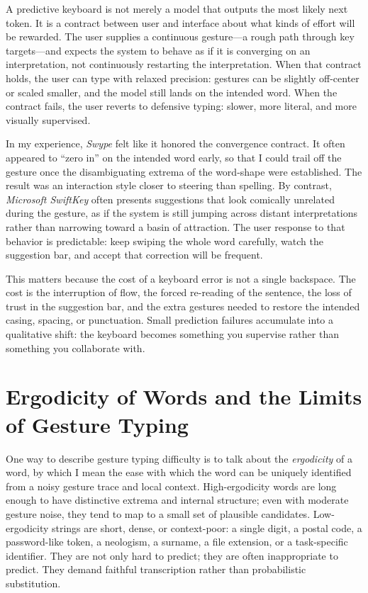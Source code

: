 \documentclass[11pt]{article}
\begin{document}
A predictive keyboard is not merely a model that outputs the most likely next token. It is a contract between user and interface about what kinds of effort will be rewarded. The user supplies a continuous gesture---a rough path through key targets---and expects the system to behave as if it is converging on an interpretation, not continuously restarting the interpretation. When that contract holds, the user can type with relaxed precision: gestures can be slightly off-center or scaled smaller, and the model still lands on the intended word. When the contract fails, the user reverts to defensive typing: slower, more literal, and more visually supervised.

In my experience, \textit{Swype} felt like it honored the convergence contract. It often appeared to ``zero in'' on the intended word early, so that I could trail off the gesture once the disambiguating extrema of the word-shape were established. The result was an interaction style closer to steering than spelling. By contrast, \textit{Microsoft SwiftKey} often presents suggestions that look comically unrelated during the gesture, as if the system is still jumping across distant interpretations rather than narrowing toward a basin of attraction. The user response to that behavior is predictable: keep swiping the whole word carefully, watch the suggestion bar, and accept that correction will be frequent.

This matters because the cost of a keyboard error is not a single backspace. The cost is the interruption of flow, the forced re-reading of the sentence, the loss of trust in the suggestion bar, and the extra gestures needed to restore the intended casing, spacing, or punctuation. Small prediction failures accumulate into a qualitative shift: the keyboard becomes something you supervise rather than something you collaborate with.

\section{Ergodicity of Words and the Limits of Gesture Typing}

One way to describe gesture typing difficulty is to talk about the \emph{ergodicity} of a word, by which I mean the ease with which the word can be uniquely identified from a noisy gesture trace and local context. High-ergodicity words are long enough to have distinctive extrema and internal structure; even with moderate gesture noise, they tend to map to a small set of plausible candidates. Low-ergodicity strings are short, dense, or context-poor: a single digit, a postal code, a password-like token, a neologism, a surname, a file extension, or a task-specific identifier. They are not only hard to predict; they are often inappropriate to predict. They demand faithful transcription rather than probabilistic substitution.
\end{document}
